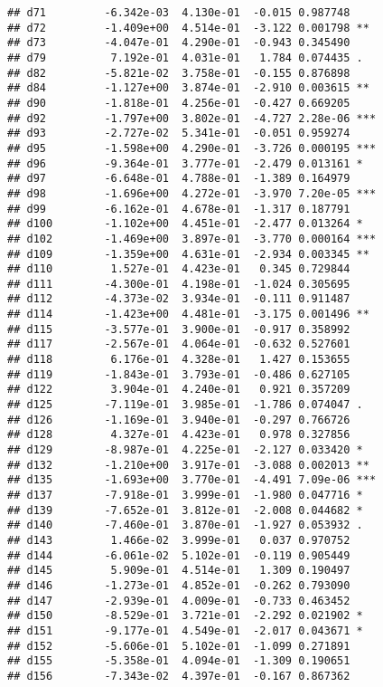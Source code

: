 \documentclass[
]{article}
\begin{document}
\begin{verbatim}
## d71         -6.342e-03  4.130e-01  -0.015 0.987748    
## d72         -1.409e+00  4.514e-01  -3.122 0.001798 ** 
## d73         -4.047e-01  4.290e-01  -0.943 0.345490    
## d79          7.192e-01  4.031e-01   1.784 0.074435 .  
## d82         -5.821e-02  3.758e-01  -0.155 0.876898    
## d84         -1.127e+00  3.874e-01  -2.910 0.003615 ** 
## d90         -1.818e-01  4.256e-01  -0.427 0.669205    
## d92         -1.797e+00  3.802e-01  -4.727 2.28e-06 ***
## d93         -2.727e-02  5.341e-01  -0.051 0.959274    
## d95         -1.598e+00  4.290e-01  -3.726 0.000195 ***
## d96         -9.364e-01  3.777e-01  -2.479 0.013161 *  
## d97         -6.648e-01  4.788e-01  -1.389 0.164979    
## d98         -1.696e+00  4.272e-01  -3.970 7.20e-05 ***
## d99         -6.162e-01  4.678e-01  -1.317 0.187791    
## d100        -1.102e+00  4.451e-01  -2.477 0.013264 *  
## d102        -1.469e+00  3.897e-01  -3.770 0.000164 ***
## d109        -1.359e+00  4.631e-01  -2.934 0.003345 ** 
## d110         1.527e-01  4.423e-01   0.345 0.729844    
## d111        -4.300e-01  4.198e-01  -1.024 0.305695    
## d112        -4.373e-02  3.934e-01  -0.111 0.911487    
## d114        -1.423e+00  4.481e-01  -3.175 0.001496 ** 
## d115        -3.577e-01  3.900e-01  -0.917 0.358992    
## d117        -2.567e-01  4.064e-01  -0.632 0.527601    
## d118         6.176e-01  4.328e-01   1.427 0.153655    
## d119        -1.843e-01  3.793e-01  -0.486 0.627105    
## d122         3.904e-01  4.240e-01   0.921 0.357209    
## d125        -7.119e-01  3.985e-01  -1.786 0.074047 .  
## d126        -1.169e-01  3.940e-01  -0.297 0.766726    
## d128         4.327e-01  4.423e-01   0.978 0.327856    
## d129        -8.987e-01  4.225e-01  -2.127 0.033420 *  
## d132        -1.210e+00  3.917e-01  -3.088 0.002013 ** 
## d135        -1.693e+00  3.770e-01  -4.491 7.09e-06 ***
## d137        -7.918e-01  3.999e-01  -1.980 0.047716 *  
## d139        -7.652e-01  3.812e-01  -2.008 0.044682 *  
## d140        -7.460e-01  3.870e-01  -1.927 0.053932 .  
## d143         1.466e-02  3.999e-01   0.037 0.970752    
## d144        -6.061e-02  5.102e-01  -0.119 0.905449    
## d145         5.909e-01  4.514e-01   1.309 0.190497    
## d146        -1.273e-01  4.852e-01  -0.262 0.793090    
## d147        -2.939e-01  4.009e-01  -0.733 0.463452    
## d150        -8.529e-01  3.721e-01  -2.292 0.021902 *  
## d151        -9.177e-01  4.549e-01  -2.017 0.043671 *  
## d152        -5.606e-01  5.102e-01  -1.099 0.271891    
## d155        -5.358e-01  4.094e-01  -1.309 0.190651    
## d156        -7.343e-02  4.397e-01  -0.167 0.867362    

\end{verbatim}
\end{document}
